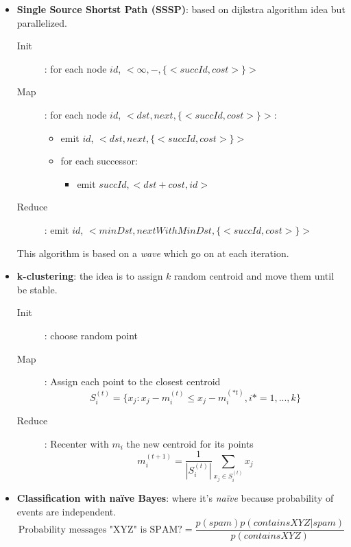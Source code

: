 \begin{itemize}
    \item \textbf{Single Source Shortst Path (SSSP)}: based on dijkstra algorithm idea but parallelized.
        \begin{description}
            \item[Init]: for each node $id$, $<\infty, -, \{<succId, cost>\}>$
            \item[Map]: for each node $id$, $<dst, next, \{<succId, cost>\}>$:
                \begin{itemize}
                    \item emit $id$, $<dst, next, \{<succId, cost>\}>$
                    \item for each successor:
                        \begin{itemize}
                            \item emit $succId, <dst+cost, id>$ 
                        \end{itemize}
                \end{itemize}
            \item[Reduce]: emit $id$, $<minDst, nextWithMinDst, \{<succId, cost>\}>$
        \end{description}

        This algorithm is based on a \textit{wave} which go on at each iteration.

    \item \textbf{k-clustering}: the idea is to assign $k$ random centroid and move them 
        until be stable.
        \begin{description}
            \item[Init]: choose random point
            \item[Map]: Assign each point to the closest centroid
                $$S_i^{(t)} = \{ x_j : x_j − m_i^{(t)} ≤ x_j − m_i^{(* t )} , i* = 1,..., k \}$$
            \item[Reduce]: Recenter with $m_i$ the new centroid for its points
                $$m_i^{(t+1)} = \frac{1}{|S_i^{(t)}|} \sum_{x_j \in S_i^{(t)}} x_j$$
        \end{description}

    \item \textbf{Classification with naïve Bayes}: where it's \textit{naïve} because probability
        of events are independent.
        $$\textrm{Probability messages "XYZ" is SPAM?} = \frac{p(spam) p(containsXYZ | spam)}
        {p(containsXYZ)}$$ 


\end{itemize}
